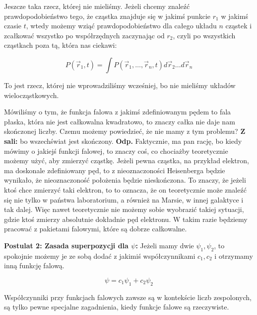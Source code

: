 Jeszcze taka rzecz, której nie mieliśmy. Jeżeli chcemy znaleźć prawdopodobieństwo tego, że cząstka znajduje się w jakimś punkcie $r_1$ w jakimś czasie $t$, wtedy możemy wziąć prawdopodobieństwo dla całego układu $n$ cząstek i zcałkować wszystko po współrzędnych zaczynając od $r_2$, czyli po wszystkich cząstkach poza tą, która nas ciekawi:

\begin{equation*}
	P(\vec{r}_1, t) = \int P (\vec{r}_1, \dots, \vec{r}_n, t) d\vec{r}_2\dots d\vec{r}_n
\end{equation*}

To jest rzecz, której nie wprowadziliśmy wcześniej, bo nie mieliśmy układów wielocząstkowych.

Mówiliśmy o tym, że funkcja falowa z jakimś zdefiniowanym pędem to fala płaska, która nie jest całkowalna kwadratowo, to znaczy całka nie daje nam skończonej liczby. Czemu możemy powiedzieć, że nie mamy z tym problemu? \textbf{Z sali:} bo wszechświat jest skończony. \textbf{Odp.} Faktycznie, ma pan rację, bo kiedy mówimy o jakiejś funkcji falowej, to znaczy coś, co chociażby teoretycznie możemy użyć, aby zmierzyć cząstkę. Jeżeli pewna cząstka, na przykład elektron, ma doskonale zdefiniowany pęd, to z nieoznaczoności Heisenberga będzie wynikało, że nieoznaczoność położenia będzie nieskończona. To znaczy, że jeżeli ktoś chce zmierzyć taki elektron, to to oznacza, że on teoretycznie może znaleźć się nie tylko w państwa laboratorium, a również na Marsie, w innej galaktyce i tak dalej. Więc nawet teoretycznie nie możemy sobie wyobrazić takiej sytuacji, gdzie ktoś zmierzy absolutnie dokładnie pęd elektronu. W takim razie będziemy pracować z pakietami falowymi, które są dobrze całkowalne.

\textbf{Postulat 2: Zasada superpozycji dla $\psi$:} Jeżeli mamy dwie $\psi_1, \psi_2$, to spokojnie możemy je ze sobą dodać z jakimiś współczynnikami $c_1, c_2$ i otrzymamy inną funkcję falową. 

\begin{equation*}
	\psi = c_1 \psi_1 + c_2 \psi_2
\end{equation*}

Współczynniki przy funkcjach falowych zawsze są w kontekście liczb zespolonych, są tylko pewne specjalne zagadnienia, kiedy funkcje falowe są rzeczywiste.


